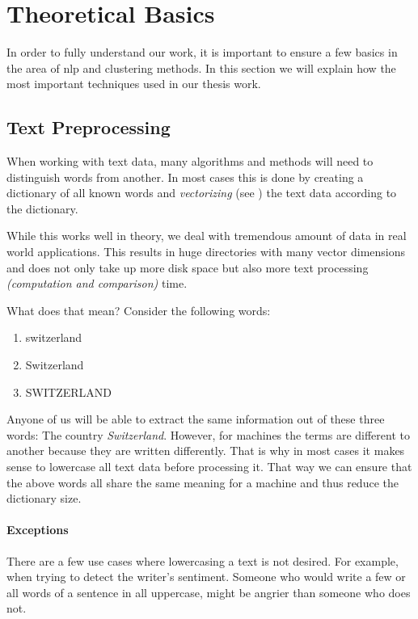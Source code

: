 \section{Theoretical Basics}
\label{sec:3_theoretical_basics}

In order to fully understand our work,
it is important to ensure a few basics in the area of \Gls{nlp} and clustering methods.
In this section we will explain how the most important techniques used in our thesis work.

\subsection{Text Preprocessing}
\label{subsec:3_text_preprocessing}

When working with text data, many algorithms and methods will need to distinguish words from another.
In most cases this is done by creating a dictionary of all known words and \textit{vectorizing}
(see ) the text data according to the dictionary.

While this works well in theory, we deal with tremendous amount of data in real world applications.
This results in huge directories with many vector dimensions and does not only take up more disk space
but also more text processing \textit{(computation and comparison)} time.

What does that mean?
Consider the following words:

\begin{enumerate}
    \item switzerland
    \item Switzerland
    \item SWITZERLAND
\end{enumerate}

Anyone of us will be able to extract the same information out of these three words:
The country \textit{Switzerland}.
However, for machines the terms are different to another because they are written differently.
That is why in most cases it makes sense to lowercase all text data before processing it.
That way we can ensure that the above words all share the same meaning
for a machine and thus reduce the dictionary size.

\paragraph{Exceptions}
There are a few use cases where lowercasing a text is not desired.
For example, when trying to detect the writer's sentiment.
Someone who would write a few or all words of a sentence in all uppercase,
might be angrier than someone who does not.

